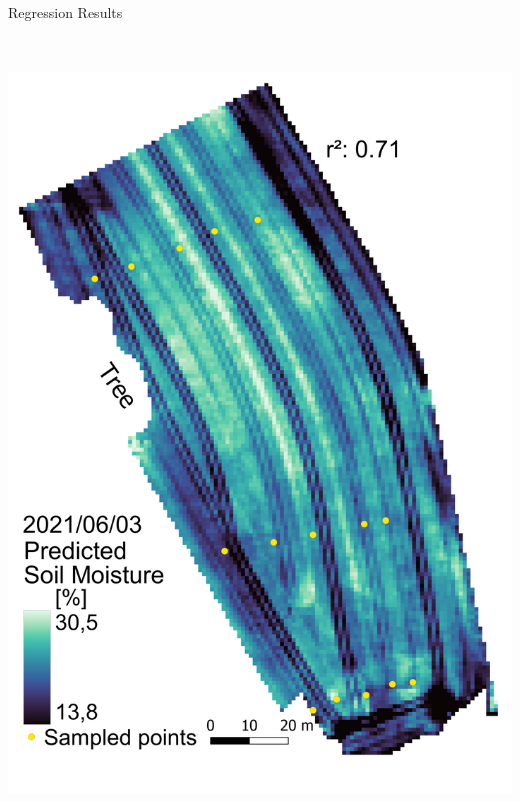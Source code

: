 \documentclass[final,hyperref={pdfpagelabels=false}]{beamer}
\begin{document}
\begin{frame}
\begin{minipage}[t][][t]{0.48\paperwidth}
\begin{block}{Regression Results}
\begin{minipage}{0.17\paperwidth}
    \includegraphics[height=21cm]{pics/svr_20210603_moisture.png}
\end{minipage}
\begin{minipage}{0.14\paperwidth}

\end{minipage}
\end{block}
\end{minipage}
\end{frame}
\end{document}
